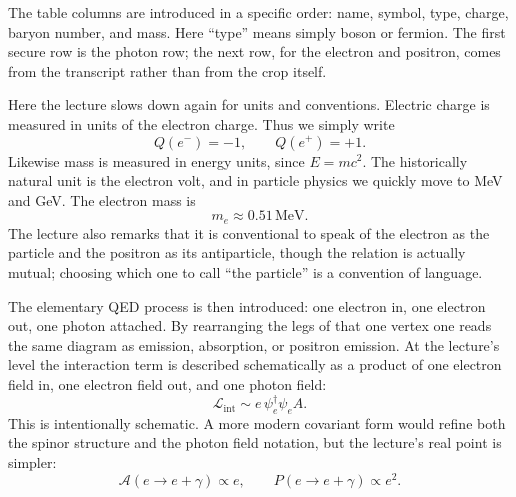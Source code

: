 The table columns are introduced in a specific order: name, symbol, type, charge, baryon number, and mass. Here ``type'' means simply boson or fermion. The first secure row is the photon row; the next row, for the electron and positron, comes from the transcript rather than from the crop itself.

\begin{table}[h]
\centering
{}%
\caption{A cleaned continuation of the lecture's first table entries. Only the photon row is directly visible in the accepted crop; the electron row is added from the transcript.}
\end{table}

Here the lecture slows down again for units and conventions. Electric charge is measured in units of the electron charge. Thus we simply write
\begin{equation}
Q(e^-)=-1,\qquad Q(e^+)=+1.
\end{equation}
Likewise mass is measured in energy units, since \(E=mc^2\). The historically natural unit is the electron volt, and in particle physics we quickly move to MeV and GeV. The electron mass is
\begin{equation}
m_e \approx 0.51\,\mathrm{MeV}.
\end{equation}
The lecture also remarks that it is conventional to speak of the electron as the particle and the positron as its antiparticle, though the relation is actually mutual; choosing which one to call ``the particle'' is a convention of language.

The elementary QED process is then introduced: one electron in, one electron out, one photon attached. By rearranging the legs of that one vertex one reads the same diagram as emission, absorption, or positron emission. At the lecture's level the interaction term is described schematically as a product of one electron field in, one electron field out, and one photon field:
\begin{equation}
\mathcal{L}_{\mathrm{int}}\sim e\,\psi_e^\dagger \psi_e A.
\end{equation}
This is intentionally schematic. A more modern covariant form would refine both the spinor structure and the photon field notation, but the lecture's real point is simpler:
\begin{equation}
\mathcal{A}(e\to e+\gamma)\propto e,
\qquad
P(e\to e+\gamma)\propto e^2.
\end{equation}

